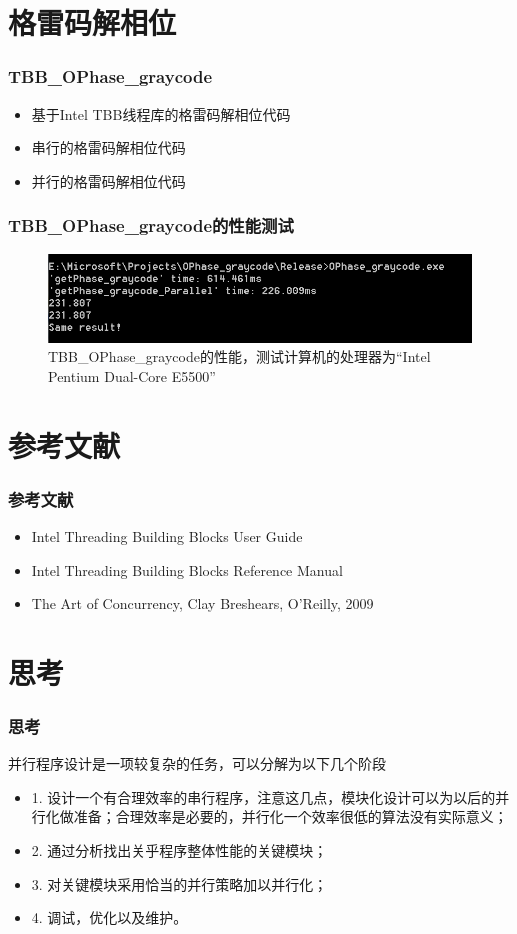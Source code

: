 \documentclass[hyperref={unicode},13pt,a4paper]{beamer}
\begin{document}
\begin{CJK*}{UTF8}{song}
\section{格雷码解相位}
\begin{frame}
	\frametitle{TBB\_OPhase\_graycode}
	\begin{itemize}
    \item 基于Intel TBB线程库的格雷码解相位代码
    \item 串行的格雷码解相位代码
    \item 并行的格雷码解相位代码
    \end{itemize}
\end{frame}

\begin{frame}
	\frametitle{TBB\_OPhase\_graycode的性能测试}
    \begin{figure}
    \centering
    \includegraphics[width=0.9\linewidth]{tbb_ophase_graycode_performance}
    \caption[TBB\_OPhase\_graycode的性能]{TBB\_OPhase\_graycode的性能，测试计算机的处理器为“Intel Pentium Dual-Core E5500”} 
    \label{fig:tbb_ophase_graycode_performance}
    \end{figure}
\end{frame}

\section{参考文献}
\begin{frame}
	\frametitle{参考文献}
	\begin{itemize}
    \item Intel Threading Building Blocks User Guide
    \item Intel Threading Building Blocks Reference Manual
    \item The Art of Concurrency, Clay Breshears, O'Reilly, 2009
    \end{itemize}
\end{frame}

\section{思考}
\begin{frame}
	\frametitle{思考}
	并行程序设计是一项较复杂的任务，可以分解为以下几个阶段
	\begin{itemize}
    \item 1. 设计一个有合理效率的串行程序，注意这几点，模块化设计可以为以后的并行化做准备；合理效率是必要的，并行化一个效率很低的算法没有实际意义；
    \item 2. 通过分析找出关乎程序整体性能的关键模块；
    \item 3. 对关键模块采用恰当的并行策略加以并行化；
    \item 4. 调试，优化以及维护。
    \end{itemize}
\end{frame}


\end{CJK*}
\end{document}
